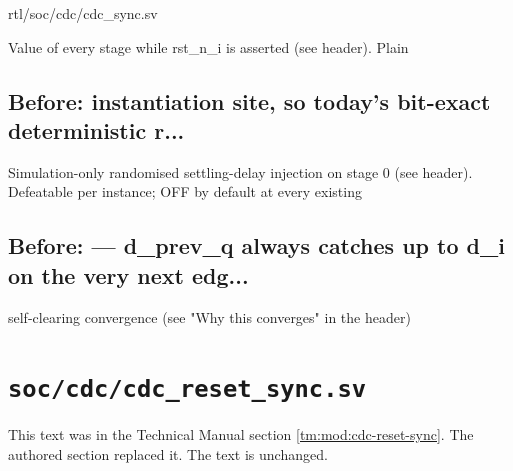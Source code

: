 \begin{relocated}{rtl/soc/cdc/cdc_sync.sv}
\begin{textblock}
Value of every stage while rst_n_i is asserted (see header). Plain
\end{textblock}

\subsection*{Before: instantiation site, so today's bit-exact deterministic r...}

\begin{textblock}
Simulation-only randomised settling-delay injection on stage 0 (see
header). Defeatable per instance; OFF by default at every existing
\end{textblock}

\subsection*{Before: — d\_prev\_q always catches up to d\_i on the very next edg...}

\begin{textblock}
self-clearing convergence (see "Why this converges" in the header)
\end{textblock}

\end{relocated}

\section{\texttt{soc/cdc/cdc\_reset\_sync.sv}}\label{cr:arc:tm-cdc-reset-sync}

This text was in the Technical Manual section \cref{tm:mod:cdc-reset-sync}. The authored section replaced it. The text is unchanged.

